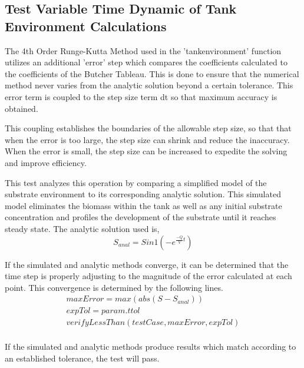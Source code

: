 \documentclass[letterpaper, twoside]{article}
\numberwithin{equation}{section}
\begin{document}
\subsection{Test Variable Time Dynamic of Tank Environment Calculations}
The 4th Order Runge-Kutta Method used in the 'tankenvironment' function utilizes an additional 'error' step which compares the coefficients calculated to the coefficients of the Butcher Tableau. This is done to ensure that the numerical method never varies from the analytic solution beyond a certain tolerance. This error term is coupled to the step size term dt so that maximum accuracy is obtained. 

This coupling establishes the boundaries of the allowable step size, so that that when the error is too large, the step size can shrink and reduce the inaccuracy. When the error is small, the step size can be increased to expedite the solving and improve efficiency. 

This test analyzes this operation by comparing a simplified model of the substrate environment to its corresponding analytic solution. This simulated model eliminates the biomass within the tank as well as any initial substrate concentration and profiles the development of the substrate until it reaches steady state. The analytic solution used is,
\begin{equation} \label{eq: S_anal}
  S_{anal}=Sin 1{(-e^{\frac{-Q}{V}t})}
\end{equation}

If the simulated and analytic methods converge, it can be determined that the time step is properly adjusting to the magnitude of the error calculated at each point. This convergence is determined by the following lines.
\begin{align*}
maxError=max(abs(S-S_{anal})) \\
expTol=param.ttol \\
verifyLessThan(testCase,maxError,expTol) \\
\end{align*}

If the simulated and analytic methods produce results which match according to an established tolerance, the test will pass. 
\end{document}
